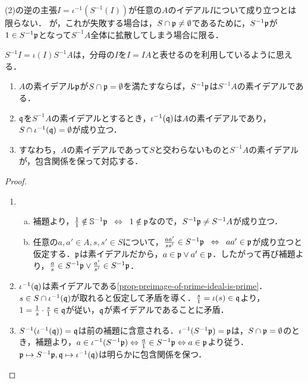 \documentclass[uplatex,dvipdfmx]{jsreport}
\begin{document}
\begin{remark}
    (2)の逆の主張$I=\iota^{-1}(S^{-1}(I))$が任意の$A$のイデアル$I$について成り立つとは限らない．
    が，これが失敗する場合は，$S\cap\mathfrak{p}\ne\emptyset$であるために，$S^{-1}\mathfrak{p}$が$1\in S^{-1}\mathfrak{p}$となって$S^{-1}A$全体に拡散してしまう場合に限る．
\end{remark}
\begin{remarks}
    $S^{-1}I=\iota(I)S^{-1}A$は，分母の$I$を$I=IA$と表せるのを利用しているように思える．
\end{remarks}

\begin{proposition}[素イデアルの対応]\mbox{}\label{prop-correspondence-of-prime-ideals-of-localization}
    \begin{enumerate}
        \item $A$の素イデアル$\mathfrak{p}$が$S\cap\mathfrak{p}=\emptyset$を満たすならば，$S^{-1}\mathfrak{p}$は$S^{-1}A$の素イデアルである．
        \item $\mathfrak{q}$を$S^{-1}A$の素イデアルとするとき，$\iota^{-1}(\mathfrak{q})$は$A$の素イデアルであり，$S\cap\iota^{-1}(\mathfrak{q})=\emptyset$が成り立つ．
        \item すなわち，$A$の素イデアルであって$S$と交わらないものと$S^{-1}A$の素イデアルが，包含関係を保って対応する．
    \end{enumerate}
\end{proposition}
\begin{proof}\mbox{}
    \begin{enumerate}
        \item \begin{enumerate}[(a)]
            \item 補題より，$\frac{1}{1}\notin\mathbb{S}^{-1}\mathfrak{p}\;\;\Leftrightarrow\;\; 1\notin\mathfrak{p}$なので，$S^{-1}\mathfrak{p}\ne S^{-1}A$が成り立つ．
            \item 任意の$a,a'\in A,s,s'\in S$について，$\frac{aa'}{ss'}\in S^{-1}\mathfrak{p}\;\;\Leftrightarrow\;\; aa'\in\mathfrak{p}$が成り立つと仮定する．$\mathfrak{p}$は素イデアルだから，$a\in\mathfrak{p}\lor a'\in\mathfrak{p}$．したがって再び補題より，$\frac{a}{s}\in S^{-1}\mathfrak{p}\lor\frac{a'}{s'}\in S^{-1}\mathfrak{p}$．
        \end{enumerate}
        \item $\iota^{-1}(\mathfrak{q})$は素イデアルである\ref{prop-preimage-of-prime-ideal-is-prime}．$s\in S\cap\iota^{-1}(\mathfrak{q})$が取れると仮定して矛盾を導く．$\frac{s}{1}=\iota(s)\in\mathfrak{q}$より，$1=\frac{1}{s}\cdot\frac{s}{1}\in\mathfrak{q}$が従い，$\mathfrak{q}$が素イデアルであることに矛盾．
        \item $S^{-1}(\iota^{-1}(\mathfrak{q}))=\mathfrak{q}$は前の補題に含意される．$\iota^{-1}(S^{-1}\mathfrak{p})=\mathfrak{p}$は，$S\cap\mathfrak{p}=\emptyset$のとき，補題より，$a\in\iota^{-1}(S^{-1}\mathfrak{p})\Leftrightarrow\frac{a}{1}\in S^{-1}\mathfrak{p}\Leftrightarrow a\in\mathfrak{p}$より従う．$\mathfrak{p}\mapsto S^{-1}\mathfrak{p},\mathfrak{q}\mapsto\iota^{-1}(\mathfrak{q})$は明らかに包含関係を保つ．
    \end{enumerate}
\end{proof}
\end{document}
